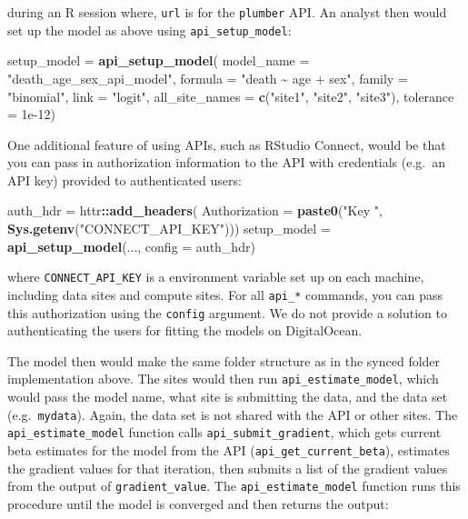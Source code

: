 \documentclass[]{elsarticle} %
\newenvironment{Shaded}{\begin{snugshade}}{\end{snugshade}}
\newcommand{\DataTypeTok}[1]{\textcolor[rgb]{0.13,0.29,0.53}{#1}}
\newcommand{\FloatTok}[1]{\textcolor[rgb]{0.00,0.00,0.81}{#1}}
\newcommand{\KeywordTok}[1]{\textcolor[rgb]{0.13,0.29,0.53}{\textbf{#1}}}
\newcommand{\NormalTok}[1]{#1}
\newcommand{\OperatorTok}[1]{\textcolor[rgb]{0.81,0.36,0.00}{\textbf{#1}}}
\newcommand{\StringTok}[1]{\textcolor[rgb]{0.31,0.60,0.02}{#1}}
\begin{document}
during an R session where, \texttt{url} is for the \texttt{plumber} API. An analyst then would set up the model as above using \texttt{api\_setup\_model}:

\begin{Shaded}
\begin{Highlighting}[]
\NormalTok{setup\_model =}\StringTok{ }\KeywordTok{api\_setup\_model}\NormalTok{(}
  \DataTypeTok{model\_name =} \StringTok{"death\_age\_sex\_api\_model"}\NormalTok{, }
  \DataTypeTok{formula =} \StringTok{"death \textasciitilde{} age + sex"}\NormalTok{, }\DataTypeTok{family =} \StringTok{"binomial"}\NormalTok{, }
  \DataTypeTok{link =} \StringTok{"logit"}\NormalTok{,}
  \DataTypeTok{all\_site\_names =} \KeywordTok{c}\NormalTok{(}\StringTok{"site1"}\NormalTok{, }\StringTok{"site2"}\NormalTok{, }\StringTok{"site3"}\NormalTok{), }
  \DataTypeTok{tolerance =} \FloatTok{1e{-}12}\NormalTok{)}
\end{Highlighting}
\end{Shaded}

One additional feature of using APIs, such as RStudio Connect, would be that you can pass in authorization information to the API with credentials (e.g.~an API key) provided to authenticated users:

\begin{Shaded}
\begin{Highlighting}[]
\NormalTok{auth\_hdr =}\StringTok{ }\NormalTok{httr}\OperatorTok{::}\KeywordTok{add\_headers}\NormalTok{(}
  \DataTypeTok{Authorization =} \KeywordTok{paste0}\NormalTok{(}\StringTok{"Key "}\NormalTok{, }\KeywordTok{Sys.getenv}\NormalTok{(}\StringTok{"CONNECT\_API\_KEY"}\NormalTok{)))}
\NormalTok{setup\_model =}\StringTok{ }\KeywordTok{api\_setup\_model}\NormalTok{(..., }\DataTypeTok{config =}\NormalTok{ auth\_hdr)}
\end{Highlighting}
\end{Shaded}

where \texttt{CONNECT\_API\_KEY} is a environment variable set up on each machine, including data sites and compute sites. For all \texttt{api\_*} commands, you can pass this authorization using the \texttt{config} argument. We do not provide a solution to authenticating the users for fitting the models on DigitalOcean.

The model then would make the same folder structure as in the synced folder implementation above. The sites would then run \texttt{api\_estimate\_model}, which would pass the model name, what site is submitting the data, and the data set (e.g.~\texttt{mydata}). Again, the data set is not shared with the API or other sites. The \texttt{api\_estimate\_model} function calls \texttt{api\_submit\_gradient}, which gets current beta estimates for the model from the API (\texttt{api\_get\_current\_beta}), estimates the gradient values for that iteration, then submits a list of the gradient values from the output of \texttt{gradient\_value}. The \texttt{api\_estimate\_model} function runs this procedure until the model is converged and then returns the output:
\end{document}
